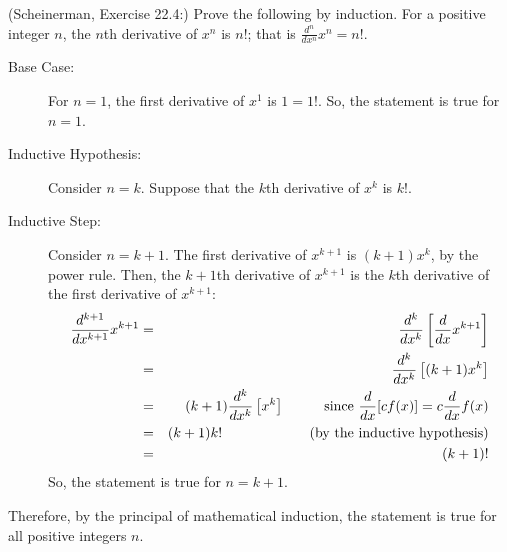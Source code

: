 \documentclass{article}
\theoremstyle{definition}
\begin{document}
\begin{question}{20}
    (Scheinerman, Exercise 22.4:) 
    Prove the following by induction.  For a positive integer $n$, the $n$th derivative of $x^n$ is $n!$; that is $ \displaystyle \frac{d^n}{dx^n} x^n = n!$.
\end{question}
\begin{solution}
   \begin{description}
    \item[Base Case: ] For $n = 1$, the first derivative of $x^1$ is $1 = 1!$.  So, the statement is true for $n = 1$.
    \item[Inductive Hypothesis: ] Consider $n = k$.  Suppose that the $k$th derivative of $x^k$ is $k!$.
    \item[Inductive Step: ] Consider $n = k+1$.  The first derivative of $x^{k+1}$ is $(k+1)x^k$, by the power rule.  Then, the $k+1$th derivative of $x^{k+1}$ is the $k$th derivative of the first derivative of $x^{k+1}$:
    \begin{eqnarray*}
    \frac{d^{k+1}}{dx^{k+1}} x^{k+1} & = & \frac{d^k}{dx^k}\left[ \frac{d}{dx} x^{k+1}\right] \\
	& = & \frac{d^k}{dx^k}\left[ (k+1) x^k\right] \\
	& = & (k+1) \frac{d^k}{dx^k}\left[x^k\right] \hspace{1cm} \text{since } \frac{d}{dx} [cf(x)] = c \frac{d}{dx} f(x)\\
	& = & (k+1) k! \hspace{2.2cm} \text{(by the inductive hypothesis)} \\
	& = & (k+1)!
    \end{eqnarray*}
    So, the statement is true for $n=k+1$.
    \end{description}
    Therefore, by the principal of mathematical induction, the statement is true for all positive integers $n$.
\end{solution}
\end{document}
